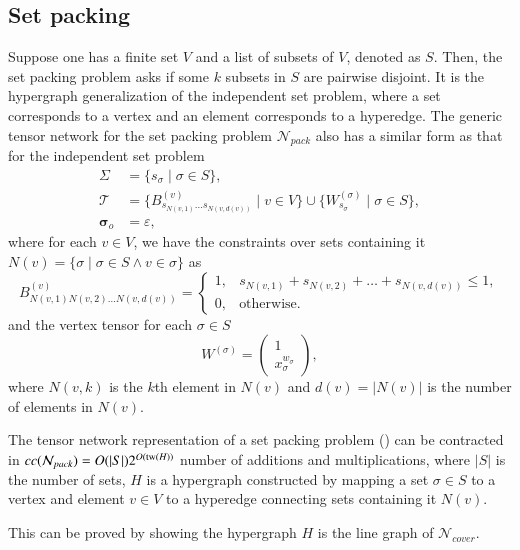 \documentclass[review, onefignum, onetabnum]{siamart190516}
\begin{document}
\subsection{Set packing}
Suppose one has a finite set $V$ and a list of subsets of $V$, denoted as $S$. Then, the set packing problem asks if some $k$ subsets in $S$ are pairwise disjoint.
It is the hypergraph generalization of the independent set problem, where a set corresponds to a vertex and an element corresponds to a hyperedge.
The generic tensor network for the set packing problem $\mathcal{N}_{pack}$ also has a similar form as that for the independent set problem
\begin{equation}\label{eq:packtensornetwork}
\begin{split}
    \Sigma &= \{s_\sigma \mid \sigma \in S\},\\
    \mathcal{T} &= \{B^{(v)}_{s_{N(v, 1)} \ldots s_{N(v, d(v))}} \mid v\in V\} \cup \{W^{(\sigma)}_{s_\sigma} \mid \sigma \in S\},\\
    \boldsymbol{\sigma}_o &= \varepsilon,
\end{split}
\end{equation}
where for each $v \in V$, we have the constraints over sets containing it $N(v) = \{\sigma\mid \sigma\in S \wedge v \in \sigma\}$ as
\begin{equation}
    B^{(v)}_{N(v, 1) N(v, 2)\ldots N(v, d(v))} = \begin{cases}
        1, & s_{N(v, 1)}+ s_{N(v, 2)} + \ldots + s_{N(v, d(v))}\leq 1,\\
        0, & \text{otherwise}.
    \end{cases}
\end{equation}
and the vertex tensor for each $\sigma \in S$
\begin{equation}
    W^{(\sigma)} = \left(\begin{matrix}
        1\\
        x^{w_\sigma}_{\sigma}
    \end{matrix}\right),
\end{equation}
where $N(v, k)$ is the $k$th element in $N(v)$ and $d(v) = |N(v)|$ is the number of elements in $N(v)$.

\begin{theorem}\label{thm:packcomplex}
    The tensor network representation of a set packing problem () can be contracted in $cc(\mathcal{N}_{pack}) = O(|S|)2^{O({\rm tw}(H))}$ number of additions and multiplications, where $|S|$ is the number of sets,
    $H$ is a hypergraph constructed by mapping a set $\sigma\in S$ to a vertex and element $v \in V$ to a hyperedge connecting sets containing it $N(v)$.
\end{theorem}
This can be proved by showing the hypergraph $H$ is the line graph of $\mathcal{N}_{cover}$.
\end{document}
